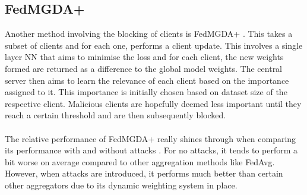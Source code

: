 \subsection{FedMGDA+}
Another method involving the blocking of clients is FedMGDA+ \cite{fedmgda}. 
This takes a subset of clients and for each one, performs a client update.
This involves a single layer NN that aims to minimise the loss and for each client, the new weights formed are returned as a difference to the global model weights.
The central server then aims to learn the relevance of each client based on the importance assigned to it. 
This importance is initially chosen based on dataset size of the respective client.
Malicious clients are hopefully deemed less important until they reach a certain threshold and are then subsequently blocked.
\\ \\
The relative performance of FedMGDA+ really shines through when comparing its performance with and without attacks \cite{fedmgda}.
For no attacks, it tends to perform a bit worse on average compared to other aggregation methods like FedAvg.
However, when attacks are introduced, it performs much better than certain other aggregators due to its dynamic weighting system in place.

